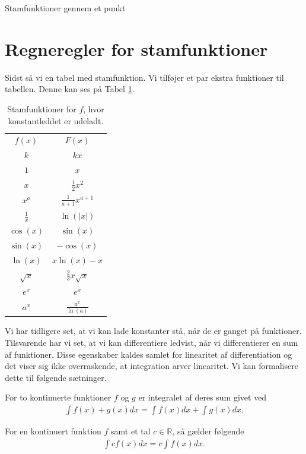 \begin{center}
\Huge
Stamfunktioner gennem et punkt
\end{center}

\section*{Regneregler for stamfunktioner}


Sidst så vi en tabel med stamfunktion. Vi tilføjer et par ekstra 
funktioner til tabellen. Denne kan ses på Tabel \ref{tab:stamfunktioner}.
\begin{table}[H]
	\centering
	\begin{tabular}{cc}
		$f(x)$ & $F(x)$ \\
		$k$    & $kx$ \\
		$1$    & $x$ \\
		$x$    & $\frac{1}{2}x^2$ \\
		$x^a$  & $\frac{1}{a+1}x^{a+1}$ \\
		$\frac{1}{x}$ & $\ln(|x|)$ \\
		$\cos(x)$ & $\sin(x)$ \\
		$\sin(x)$ & $-\cos(x)$ \\
		$\ln(x)$ & $x\ln(x) - x$ \\
		$\sqrt{x}$ & $\frac{2}{3}x\sqrt{x}$ \\	
		$e^x$ & $e^x$ \\
		$a^x$  &	  $\frac{a^x}{\ln(a)}$
	\end{tabular}
	\caption{Stamfunktioner for $f$, hvor konstantleddet er udeladt.}
	\label{tab:stamfunktioner}
\end{table}

Vi har tidligere set, at vi kan lade konstanter stå, når de er ganget på funktioner. Tilsvarende har vi set, at vi kan differentiere ledvist, når vi differentierer en sum af funktioner. Disse egenskaber kaldes samlet for linearitet af differentiation og det viser sig ikke overraskende, at integration arver linearitet. Vi kan formalisere dette til følgende sætninger.
\newpage
\begin{setn}
	For to kontinuerte funktioner $f$ og $g$ er integralet af deres sum givet ved
	\begin{align*}
		\int f(x) + g(x) dx = \int f(x) dx + \int g(x) dx.
	\end{align*}
\end{setn}
\begin{setn}
	For en kontinuert funktion $f$ samt et tal $c\in \mathbb{R}$, så gælder følgende
	\begin{align*}
		\int cf(x) dx = c\int f(x) dx.
	\end{align*}
\end{setn}

